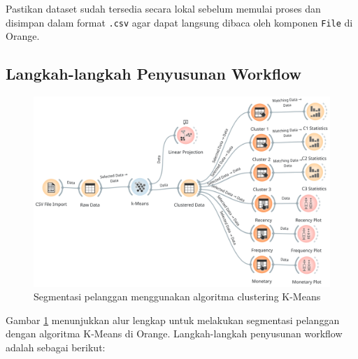 Pastikan dataset sudah tersedia secara lokal sebelum memulai proses dan disimpan dalam format \texttt{.csv} agar dapat langsung dibaca oleh komponen \texttt{File} di Orange.


\subsection*{Langkah-langkah Penyusunan Workflow}

\begin{figure}[h]
	\centering
	\includegraphics[width=\linewidth]{../figures/clustering.png}
	\caption{Segmentasi pelanggan menggunakan algoritma clustering K-Means}
	\label{fig:clustering-orange}
\end{figure}

Gambar \ref{fig:clustering-orange} menunjukkan alur lengkap untuk melakukan segmentasi pelanggan dengan algoritma K-Means di Orange. Langkah-langkah penyusunan workflow adalah sebagai berikut:

